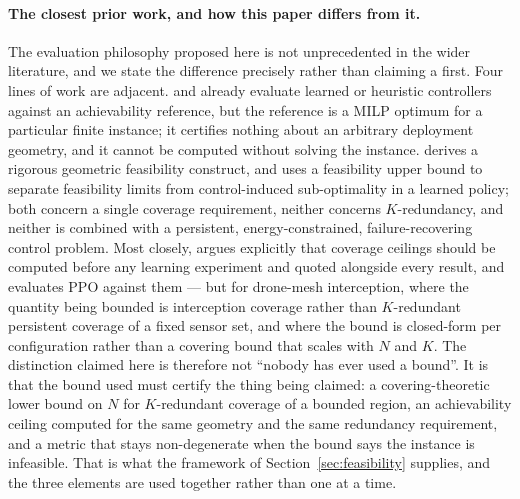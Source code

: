 \documentclass[conference]{IEEEtran}
\begin{document}
\paragraph{The closest prior work, and how this paper differs from it.}
The evaluation philosophy proposed here is not unprecedented in the wider literature, and we state the difference precisely rather than claiming a first. Four lines of work are adjacent. \cite{song2024} and \cite{fan2026} already evaluate learned or heuristic controllers against an achievability reference, but the reference is a MILP optimum for a particular finite instance; it certifies nothing about an arbitrary deployment geometry, and it cannot be computed without solving the instance. \cite{datta2025} derives a rigorous geometric feasibility construct, and \cite{viana2026} uses a feasibility upper bound to separate feasibility limits from control-induced sub-optimality in a learned policy; both concern a single coverage requirement, neither concerns $K$-redundancy, and neither is combined with a persistent, energy-constrained, failure-recovering control problem. Most closely, \cite{ceilings2026} argues explicitly that coverage ceilings should be computed before any learning experiment and quoted alongside every result, and evaluates PPO against them --- but for drone-mesh interception, where the quantity being bounded is interception coverage rather than $K$-redundant persistent coverage of a fixed sensor set, and where the bound is closed-form per configuration rather than a covering bound that scales with $N$ and $K$. The distinction claimed here is therefore not ``nobody has ever used a bound''. It is that the bound used must certify the thing being claimed: a covering-theoretic lower bound on $N$ for $K$-redundant coverage of a bounded region, an achievability ceiling computed for the same geometry and the same redundancy requirement, and a metric that stays non-degenerate when the bound says the instance is infeasible. That is what the framework of Section~\ref{sec:feasibility} supplies, and the three elements are used together rather than one at a time.
\end{document}
